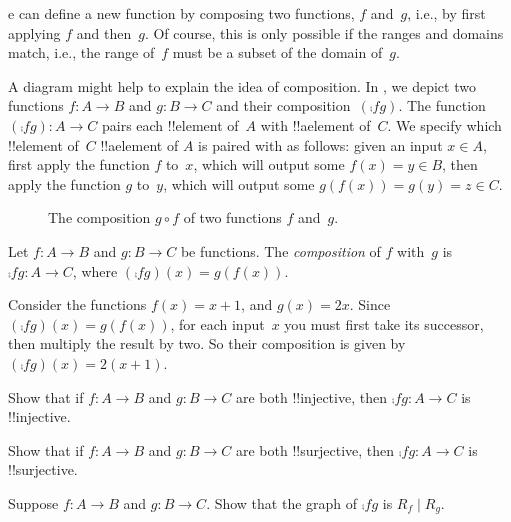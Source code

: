 \documentclass[../../../include/open-logic-section]{subfiles}
\begin{document}

\begin{explain}
e can define a new
function by composing two functions, $f$ and~$g$, i.e., by first
applying $f$ and then~$g$. Of course, this is only possible if the
ranges and domains match, i.e., the range of~$f$ must be a subset of
the domain of~$g$. 

A diagram might help to explain the idea of composition. In
, we depict two functions $f \colon A \to B$
and $g \colon B \to C$ and their composition~$(\comp{f}{g})$. The
function $(\comp{f}{g}) \colon A \to C$ pairs each !!{element} of~$A$
with !!a{element} of~$C$. We specify which !!{element} of~$C$
!!a{element} of $A$ is paired with as follows: given an input $x \in
A$, first apply the function $f$ to~$x$, which will output some $f(x)
= y \in B$, then apply the function $g$ to~$y$, which will output some
$g(f(x)) = g(y) = z \in C$.
\begin{figure}
  \caption{The composition $g \circ f$ of two functions $f$ and~$g$.}
\end{figure}
\end{explain}

\begin{defn}[Composition]
Let $f\colon A \to B$ and $g\colon B \to C$ be functions. The
\emph{composition} of $f$ with~$g$ is $\comp{f}{g} \colon A \to C$,
where $(\comp{f}{g})(x) = g(f(x))$.
\end{defn}

\begin{ex}
Consider the functions $f(x) = x + 1$, and $g(x) = 2x$. Since
$(\comp{f}{g})(x) = g(f(x))$, for each input~$x$ you must first take
its successor, then multiply the result by two. So their composition
is given by $(\comp{f}{g})(x) = 2(x+1)$.
\end{ex}

\begin{prob}
Show that if $f \colon A \to B$ and $g \colon B \to C$ are both
!!{injective}, then $\comp{f}{g}\colon A \to C$ is !!{injective}.
\end{prob}

\begin{prob}
Show that if $f \colon A \to B$ and $g \colon B \to C$ are both
!!{surjective}, then $\comp{f}{g}\colon A \to C$ is !!{surjective}.
\end{prob}

\begin{prob}
Suppose $f \colon A \to B$ and $g \colon B \to C$. Show that the graph
of $\comp{f}{g}$ is $R_f \mid R_g$.
\end{prob}
\end{document}
